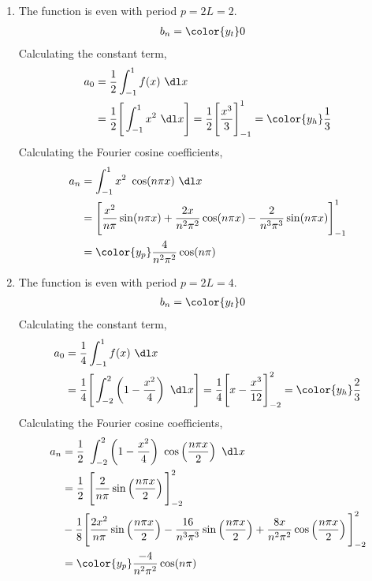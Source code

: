 \begin{enumerate}
    \item The function is even with period $ p = 2L = 2 $.
          \begin{align}
              b_n & = \color{y_t} 0
          \end{align}
          Calculating the constant term,
          \begin{align}
              a_0 & = \frac{1}{2} \int_{-1}^{1} f(x)\ \dl x              \\
                  & = \frac{1}{2} \Bigg[ \int_{-1}^{1} x^2\ \dl x \Bigg]
              = \frac{1}{2} \Bigg[\frac{x^3}{3}\Bigg]_{-1}^{1}
              = \color{y_h} \frac{1}{3}
          \end{align}
          Calculating the Fourier cosine coefficients,
          \begin{align}
              a_n & = \int_{-1}^{1} x^2\ \cos (n\pi x)\ \dl x                    \\
                  & = \Bigg[\frac{x^2}{n\pi} \sin(n\pi x) + \frac{2x}{n^2 \pi^2}
              \cos(n\pi x) - \frac{2}{n^3 \pi^3} \sin(n\pi x)\Bigg]_{-1}^{1}     \\
                  & = \color{y_p} \frac{4}{n^2 \pi^2} \cos(n\pi)
          \end{align}

    \item The function is even with period $ p = 2L = 4 $.
          \begin{align}
              b_n & = \color{y_t} 0
          \end{align}
          Calculating the constant term,
          \begin{align}
              a_0 & = \frac{1}{4} \int_{-1}^{1} f(x)\ \dl x                     \\
                  & = \frac{1}{4} \Bigg[ \int_{-2}^{2} \left( 1 - \frac{x^2}{4}
                  \right)\ \dl x \Bigg]
              = \frac{1}{4} \Bigg[x - \frac{x^3}{12}\Bigg]_{-2}^{2}
              = \color{y_h} \frac{2}{3}
          \end{align}
          Calculating the Fourier cosine coefficients,
          \begin{align}
              a_n & = \frac{1}{2}\ \int_{-2}^{2} \left( 1 - \frac{x^2}{4} \right)
              \ \cos \left( \frac{n\pi x}{2} \right)\ \dl x                            \\
                  & = \frac{1}{2}\ \Bigg[ \frac{2}{n\pi} \sin\left( \frac{n\pi x}{2}
              \right) \Bigg]_{-2}^{2}                                                  \\
                  & - \frac{1}{8} \Bigg[ \frac{2x^2}{n\pi} \sin\left( \frac{n\pi x}{2}
                  \right) - \frac{16}{n^3\pi^3} \sin\left( \frac{n\pi x}{2} \right)
                  + \frac{8x}{n^2 \pi^2} \cos\left( \frac{n\pi x}{2} \right)
              \Bigg]_{-2}^{2}                                                          \\
                  & = \color{y_p} \frac{-4}{n^2 \pi^2} \cos(n\pi)
          \end{align}


\end{enumerate}
